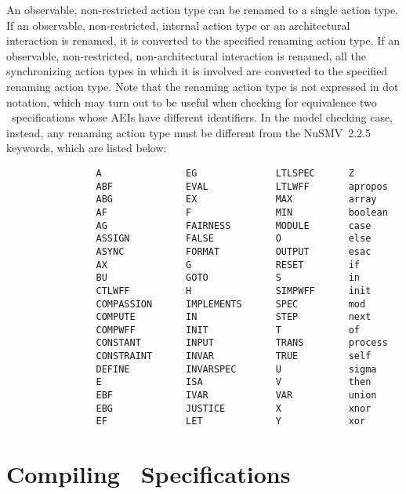 An observable, non-restricted action type can be renamed to a single action type. If an observable,
non-restricted, internal action type or an architectural interaction is renamed, it is converted to the
specified renaming action type. If an observable, non-restricted, non-architectural interaction is renamed,
all the synchronizing action types in which it is involved are converted to the specified renaming action
type. Note that the renaming action type is not expressed in dot notation, which may turn out to be useful
when checking for equivalence two \aemilia\ specifications whose AEIs have different identifiers. In the
model checking case, instead, any renaming action type must be different from the NuSMV~2.2.5 keywords,
which are listed below:

	\begin{verbatim}
                A               EG              LTLSPEC      Z
                ABF             EVAL            LTLWFF       apropos
                ABG             EX              MAX          array
                AF              F               MIN          boolean
                AG              FAIRNESS        MODULE       case
                ASSIGN          FALSE           O            else
                ASYNC           FORMAT          OUTPUT       esac
                AX              G               RESET        if
                BU              GOTO            S            in
                CTLWFF          H               SIMPWFF      init
                COMPASSION      IMPLEMENTS      SPEC         mod
                COMPUTE         IN              STEP         next
                COMPWFF         INIT            T            of
                CONSTANT        INPUT           TRANS        process
                CONSTRAINT      INVAR           TRUE         self
                DEFINE          INVARSPEC       U            sigma
                E               ISA             V            then
                EBF             IVAR            VAR          union
                EBG             JUSTICE         X            xnor
                EF              LET             Y            xor
	\end{verbatim}



\section{Compiling \aemilia\ Specifications}

